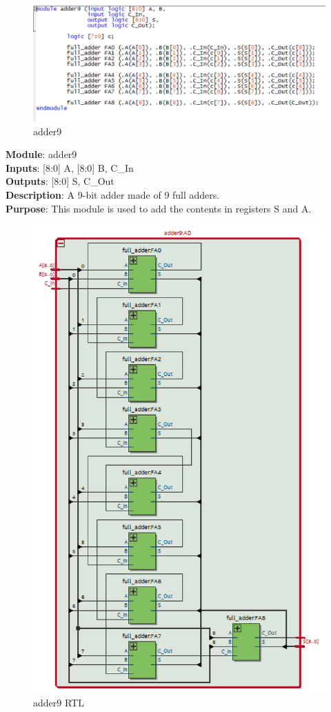 \documentclass[12pt]{article}
\begin{document}
\begin{figure}[H]
    \centering
    \includegraphics[width=15cm]{adder9.png}
    \caption{adder9}
\end{figure}
\textbf{Module}: adder9 \\ 
\textbf{Inputs}: [8:0] A, [8:0] B, C\_In \\ 
\textbf{Outputs}: [8:0] S, C\_Out \\ 
\textbf{Description}: A 9-bit adder made of 9 full adders. \\ 
\textbf{Purpose}: This module is used to add the contents in registers S and A. \\
\begin{figure}[H]
    \centering
    \includegraphics[width=15cm]{adder9_RTL.png}
    \caption{adder9 RTL}
\end{figure}
\end{document}
